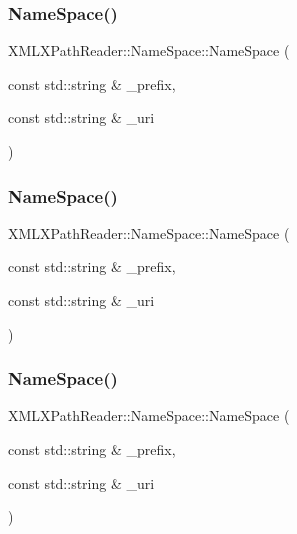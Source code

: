 \subsubsection{\texorpdfstring{NameSpace()}{NameSpace()}\hspace{0.1cm}{\footnotesize\ttfamily [1/3]}}
{\footnotesize\ttfamily X\+M\+L\+X\+Path\+Reader\+::\+Name\+Space\+::\+Name\+Space (\begin{DoxyParamCaption}\item[{const std\+::string \&}]{\+\_\+prefix,  }\item[{const std\+::string \&}]{\+\_\+uri }\end{DoxyParamCaption})\hspace{0.3cm}{\ttfamily [inline]}}

\mbox{\label{classXMLXPathReader_1_1NameSpace_a66254008c400f9a4396de32654e37ac6}} 
\subsubsection{\texorpdfstring{NameSpace()}{NameSpace()}\hspace{0.1cm}{\footnotesize\ttfamily [2/3]}}
{\footnotesize\ttfamily X\+M\+L\+X\+Path\+Reader\+::\+Name\+Space\+::\+Name\+Space (\begin{DoxyParamCaption}\item[{const std\+::string \&}]{\+\_\+prefix,  }\item[{const std\+::string \&}]{\+\_\+uri }\end{DoxyParamCaption})\hspace{0.3cm}{\ttfamily [inline]}}

\mbox{\label{classXMLXPathReader_1_1NameSpace_a66254008c400f9a4396de32654e37ac6}} 
\subsubsection{\texorpdfstring{NameSpace()}{NameSpace()}\hspace{0.1cm}{\footnotesize\ttfamily [3/3]}}
{\footnotesize\ttfamily X\+M\+L\+X\+Path\+Reader\+::\+Name\+Space\+::\+Name\+Space (\begin{DoxyParamCaption}\item[{const std\+::string \&}]{\+\_\+prefix,  }\item[{const std\+::string \&}]{\+\_\+uri }\end{DoxyParamCaption})\hspace{0.3cm}{\ttfamily [inline]}}



